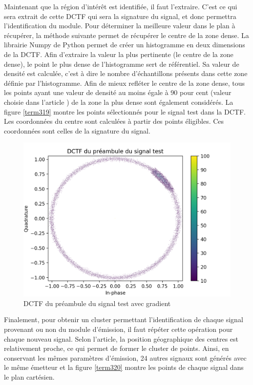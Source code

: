 \vspace{0.1cm}

Maintenant que la région d'intérêt est identifiée, il faut l'extraire. C'est ce qui sera extrait de cette \ac{DCTF} qui sera la signature du signal, et donc permettra l'identification du module. Pour déterminer la meilleure valeur dans le plan à récupérer, la méthode suivante permet de récupérer le centre de la zone dense. La librairie Numpy de Python permet de créer un histogramme en deux dimensions de la \ac{DCTF}. Afin d'extraire la valeur la plus pertinente (le centre de la zone dense), le point le plus dense de l'histogramme sert de référentiel. Sa valeur de densité est calculée, c'est à dire le nombre d'échantillons présents dans cette zone définie par l'histogramme. Afin de mieux refléter le centre de la zone dense, tous les points ayant une valeur de densité au moins égale à 90 pour cent (valeur choisie dans l'article \cite{loraDCTF}) de la zone la plus dense sont également considérés. La figure \ref{term319} montre les points sélectionnés pour le signal test dans la \ac{DCTF}. Les coordonnées du centre sont calculées à partir des points éligibles. Ces coordonnées sont celles de la signature du signal. 

\begin{figure}[h]
\centering

\includegraphics[scale=0.3]{images/dctf5.png}
\caption{DCTF du préambule du signal test avec gradient}\label{term318}
\end{figure}

Finalement, pour obtenir un cluster permettant l'identification de chaque signal provenant ou non du module d'émission, il faut répéter cette opération pour chaque nouveau signal. Selon l'article, la position géographique des centres est relativement proche, ce qui permet de former le cluster de points. Ainsi, en conservant les mêmes paramètres d'émission, 24 autres signaux sont générés avec le même émetteur et la figure \ref{term320} montre les points de chaque signal dans le plan cartésien.

